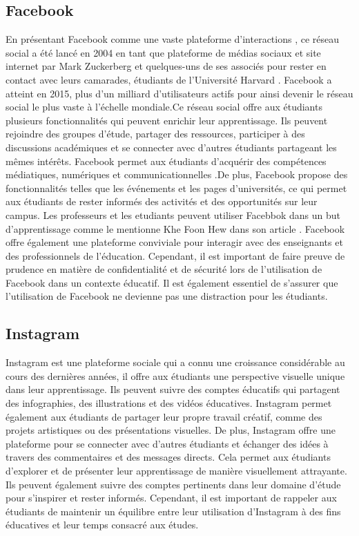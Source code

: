 \documentclass[12pt,a4paper,titlepage]{article}
\begin{document}
\subsection{Facebook} 
En présentant Facebook comme une vaste plateforme d’interactions ,  ce réseau social a été lancé en 2004 en tant que plateforme de médias sociaux et site internet par Mark Zuckerberg et quelques-uns de ses associés pour rester en contact avec leurs camarades, étudiants de l'Université Harvard . Facebook a atteint en 2015, plus d'un milliard d'utilisateurs actifs pour ainsi devenir le réseau social le plus vaste à l'échelle mondiale.Ce réseau social offre aux étudiants plusieurs fonctionnalités qui peuvent enrichir leur apprentissage. Ils peuvent rejoindre des groupes d'étude, partager des ressources, participer à des discussions académiques et se connecter avec d'autres étudiants partageant les mêmes intérêts. Facebook permet aux étudiants d’acquérir des compétences médiatiques, numériques et communicationnelles .De plus, Facebook propose des fonctionnalités telles que les événements et les pages d'universités, ce qui permet aux étudiants de rester informés des activités et des opportunités sur leur campus. Les professeurs et les etudiants peuvent utiliser Facebbok dans un but d'apprentissage comme le mentionne Khe Foon Hew dans son article \citep{hew2011students}. Facebook offre également une plateforme conviviale pour interagir avec des enseignants et des professionnels de l'éducation. Cependant, il est important de faire preuve de prudence en matière de confidentialité et de sécurité lors de l'utilisation de Facebook dans un contexte éducatif. Il est également essentiel de s'assurer que l'utilisation de Facebook ne devienne pas une distraction pour les étudiants.

\subsection{Instagram}

Instagram est une plateforme sociale qui a connu une croissance considérable au cours des dernières années, il  offre aux étudiants une perspective visuelle unique dans leur apprentissage. Ils peuvent suivre des comptes éducatifs qui partagent des infographies, des illustrations et des vidéos éducatives. Instagram permet également aux étudiants de partager leur propre travail créatif, comme des projets artistiques ou des présentations visuelles. De plus, Instagram offre une plateforme pour se connecter avec d'autres étudiants et échanger des idées à travers des commentaires et des messages directs. Cela permet aux étudiants d'explorer et de présenter leur apprentissage de manière visuellement attrayante. Ils peuvent également suivre des comptes pertinents dans leur domaine d'étude pour s'inspirer et rester informés. Cependant, il est important de rappeler aux étudiants de maintenir un équilibre entre leur utilisation d'Instagram à des fins éducatives et leur temps consacré aux études. 
\end{document}
